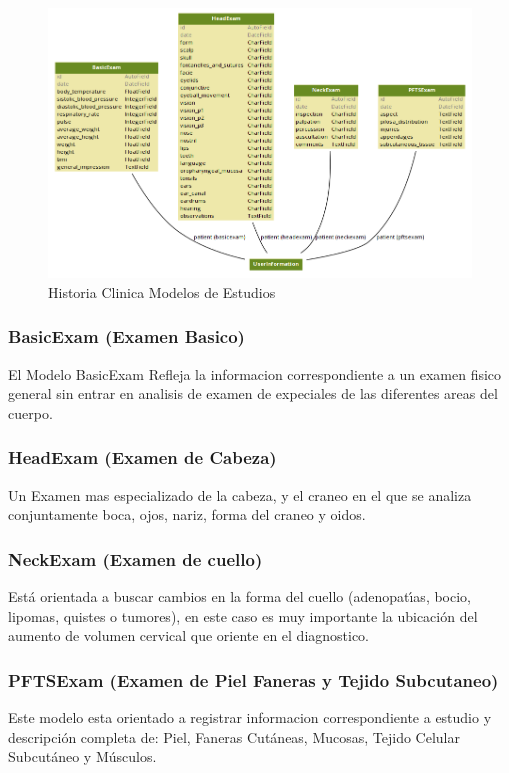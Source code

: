 \begin{figure}[H]
    \centering
    \includegraphics[scale=0.5]{resourse/hc3.png}
    \caption{Historia Clinica Modelos de Estudios}
    \label{fig:hc2}
\end{figure} 


\subsubsection{BasicExam (Examen Basico)}
El Modelo BasicExam Refleja la informacion correspondiente a un examen fisico
general sin entrar en analisis de examen de expeciales de las diferentes areas
del cuerpo.


\subsubsection{HeadExam (Examen de Cabeza)}
Un Examen mas especializado de la cabeza, y el craneo en el que se analiza
conjuntamente boca, ojos, nariz, forma del craneo y oidos.


\subsubsection{NeckExam (Examen de cuello)}
Est\'a orientada a buscar cambios en la forma del cuello (adenopat\'{\i}as, bocio,
lipomas, quistes o tumores), en este caso es muy importante la ubicación del
aumento de volumen cervical que oriente en el diagnostico.


\subsubsection{PFTSExam (Examen de Piel Faneras y Tejido Subcutaneo)}
Este modelo esta orientado a registrar informacion correspondiente a estudio y
descripción completa de: Piel, Faneras Cutáneas, Mucosas, Tejido Celular
Subcutáneo y Músculos.


